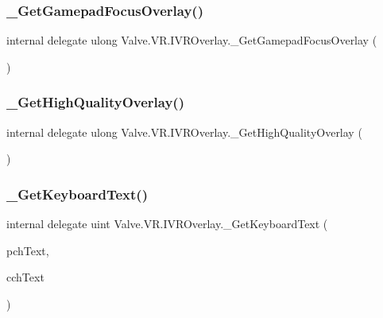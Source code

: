 \subsubsection{\texorpdfstring{\_GetGamepadFocusOverlay()}{\_GetGamepadFocusOverlay()}}
{\footnotesize\ttfamily internal delegate ulong Valve.\+V\+R.\+I\+V\+R\+Overlay.\+\_\+\+Get\+Gamepad\+Focus\+Overlay (\begin{DoxyParamCaption}{ }\end{DoxyParamCaption})}

\mbox{\label{struct_valve_1_1_v_r_1_1_i_v_r_overlay_a2e6c4ca94aa9cf9f2735457e985f1994}} 
\subsubsection{\texorpdfstring{\_GetHighQualityOverlay()}{\_GetHighQualityOverlay()}}
{\footnotesize\ttfamily internal delegate ulong Valve.\+V\+R.\+I\+V\+R\+Overlay.\+\_\+\+Get\+High\+Quality\+Overlay (\begin{DoxyParamCaption}{ }\end{DoxyParamCaption})}

\mbox{\label{struct_valve_1_1_v_r_1_1_i_v_r_overlay_a6c94397fef04c6bac6f7865bb92ed82a}} 
\subsubsection{\texorpdfstring{\_GetKeyboardText()}{\_GetKeyboardText()}}
{\footnotesize\ttfamily internal delegate uint Valve.\+V\+R.\+I\+V\+R\+Overlay.\+\_\+\+Get\+Keyboard\+Text (\begin{DoxyParamCaption}\item[{System.\+Text.\+String\+Builder}]{pch\+Text,  }\item[{uint}]{cch\+Text }\end{DoxyParamCaption})}

\mbox{\label{struct_valve_1_1_v_r_1_1_i_v_r_overlay_aaaf6e210a7faf2e505719a884eef3529}} 
